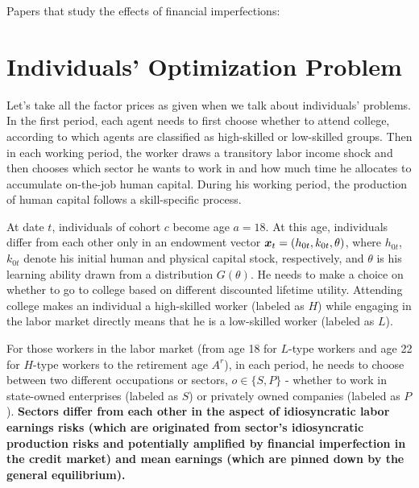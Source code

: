 \documentclass[12pt]{article}
\theoremstyle{definition}
\begin{document}
\begin{spacing}{1}
Papers that study the effects of financial imperfections: \citet{buera2011, hawkins2012, angeletos2006, krusell2000, midrigan2014}



\thispagestyle{empty}
\newpage
\setcounter{page}{1}



\section{Individuals' Optimization Problem} \label{sec:hh}
Let's take all the factor prices as given when we talk about individuals' problems. In the first period, each agent needs to first choose whether to attend college, according to which agents are classified as high-skilled or low-skilled groups. Then in each working period, the worker draws a transitory labor income shock and then chooses which sector he wants to work in and how much time he allocates to accumulate on-the-job human capital. During his working period, the production of human capital follows a skill-specific process. 

At date $t$, individuals of cohort $c$ become age $a=18$. At this age, individuals differ from each other only in an endowment vector $\boldsymbol{x}_t = \left(h_{0t}, k_{0t}, \theta\right)$, where $h_{0t}$, $k_{0t}$ denote his initial human and physical capital stock, respectively, and $\theta$ is his learning ability drawn from a distribution $G(\theta)$. He needs to make a choice on whether to go to college based on different discounted lifetime utility. Attending college makes an individual a high-skilled worker (labeled as $H$) while engaging in the labor market directly means that he is a low-skilled worker (labeled as $L$). 

For those workers in the labor market (from age 18 for $L$-type workers and age 22 for $H$-type workers to the retirement age $A^{r}$), in each period, he needs to choose between two different occupations or sectors, $o \in \{S, P\}$ - whether to work in state-owned enterprises (labeled as $S$) or privately owned companies (labeled as $P$). {\bf Sectors differ from each other in the aspect of idiosyncratic labor earnings risks (which are originated from sector's idiosyncratic production risks and potentially amplified by financial imperfection in the credit market) and mean earnings (which are pinned down by the general equilibrium).}  


\end{spacing}
\end{document}

